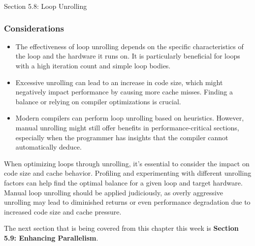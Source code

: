 \begin{notes}{Section 5.8: Loop Unrolling}
    \subsubsection*{Considerations}
    
    \begin{itemize}
        \item The effectiveness of loop unrolling depends on the specific characteristics of the loop and the hardware it runs on. It is particularly beneficial for loops with a high iteration count 
        and simple loop bodies.
        \item Excessive unrolling can lead to an increase in code size, which might negatively impact performance by causing more cache misses. Finding a balance or relying on compiler optimizations 
        is crucial.
        \item Modern compilers can perform loop unrolling based on heuristics. However, manual unrolling might still offer benefits in performance-critical sections, especially when the programmer 
        has insights that the compiler cannot automatically deduce.
    \end{itemize}

    When optimizing loops through unrolling, it's essential to consider the impact on code size and cache behavior. Profiling and experimenting with different unrolling factors can help find the optimal 
    balance for a given loop and target hardware. Manual loop unrolling should be applied judiciously, as overly aggressive unrolling may lead to diminished returns or even performance degradation due 
    to increased code size and cache pressure.
\end{notes}

The next section that is being covered from this chapter this week is \textbf{Section 5.9: Enhancing Parallelism}.

